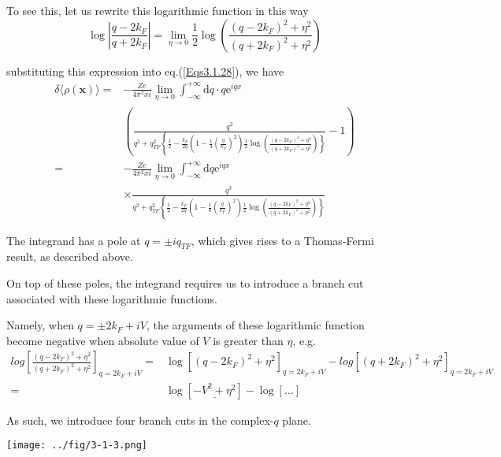 \begin{itemize}
To see this, let us rewrite this logarithmic function in this way
\begin{equation}\label{Eqs3.1.30}
\log\left| \frac{q-2 k_F}{q+ 2k_F} \right| = \lim_{\eta \rightarrow 0} \frac{1}{2} \log \left( \frac{(q-2 k_F)^2 + \eta^2}{(q + 2 k_F)^2 + \eta^2}\right)
\end{equation}

substituting this expression into eq.(\ref{Eqs3.1.28}), we have
\[\begin{split}
\delta \langle \rho(\mathbf{x}) \rangle =& -\frac{Z e}{4\pi^2 x i} \lim_{\eta \rightarrow 0} \int_{-\infty}^{+\infty} \mathrm{d} q \cdot q \mathrm{e}^{i q x}\\
& \left(  \frac{q^2}{q^2 + q_{TF}^2 \left\{\frac{1}{2}-\frac{k_F}{2q}\left( 1-\frac{1}{4}(\frac{q}{k_F})^2 \right) \frac{1}{2} \log \left( \frac{(q-2 k_F)^2 + \eta^2}{(q + 2 k_F)^2 + \eta^2}\right) \right\}} -1 \right)\\
=& -\frac{Z e}{4\pi^2 x i} \lim_{\eta \rightarrow 0} \int_{-\infty}^{+\infty} \mathrm{d} q  \mathrm{e}^{i q x}\\
&\times \frac{q^3}{q^2 + q_{TF}^2 \left\{\frac{1}{2}-\frac{k_F}{2q}\left( 1-\frac{1}{4}(\frac{q}{k_F})^2 \right) \frac{1}{2} \log \left( \frac{(q-2 k_F)^2 + \eta^2}{(q + 2 k_F)^2 + \eta^2}\right) \right\}}
\end{split}\]

The integrand has a pole at $q = \pm i q_{TF}$, which gives rises to a Thomas-Fermi result, as described above.

On top of these poles, the integrand requires us to introduce a branch cut associated with these logarithmic functions.

Namely, when $q=\pm 2 k_F + i V$, the arguments of these logarithmic function become negative when absolute value of $V$ is greater than $\eta$, e.g.
\begin{equation} \label{Eqs3.1.31} \begin{split}
log \left[ \frac{(q-2 k_F)^2 + \eta^2}{(q + 2 k_F)^2 + \eta^2}\right]_{q=2 k_F + i V} =& \log \left[ (q-2 k_F)^2 + \eta^2 \right]_{q=2 k_F + i V}-log \left[ (q+2 k_F)^2 + \eta^2 \right]_{q=2 k_F + i V}\\
=& \log\left[ \underline{-V^2 + \eta^2} \right] - \log[\ldots]
\end{split}\end{equation}

As such, we introduce four branch cuts in the complex-$q$ plane.

\begin{center} \label{Fig3.1.3}
\texttt{[image: ../fig/3-1-3.png]}
\end{center}


\end{itemize}
